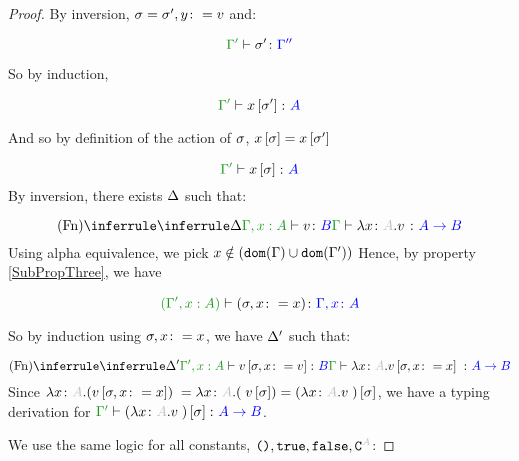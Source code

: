 \documentclass{report}
\begin{document}
\begin{framed}
\begin{proof}
            
                By inversion, $\sigma = \sigma', y\colon= v$
                and:
        
                \begin{equation}
                    \typerelation{\G'}{\si'}{\G''}
                \end{equation}
        
                So by induction,
        
                \begin{equation}
                    \typerelation{\G'}{x\sub{\si'}}{A}
                \end{equation}
        
                And so by definition of the action of $\sigma$, $x\left[\sigma\right] = x\left[\sigma'\right]$
        
                \begin{equation}
                    \typerelation{\G'}{x\sub{\si}}{A}
                \end{equation}
            By inversion, there exists $\Delta$ such that:
        
            \begin{equation}
                \ntreeruleI{Fn}{
                    \treeruleI{\D}{\typerelation{\G, x:A }{v}{B}}
                }{\typerelation{\G}{\lam{x}{A}{v}}{\ab}}
            \end{equation}
            Using alpha equivalence, we pick $x\notin(\texttt{dom}(\Gamma)\cup\texttt{dom}(\Gamma'))$
            Hence, by property \ref{SubPropThree}, we have
        
            \begin{equation}
                \typerelation{(\G', x:A )}{(\si, x\setto x)}{\gax}
            \end{equation}
        
            So by induction using $\sigma, x\colon= x$, we have $\Delta'$ such that:
        
            \begin{equation}
                \ntreeruleI{Fn}{
                    \treeruleI{\D'}{\typerelation{\G', x:A }{v\sub{\si, x\setto v}}{B}}
                }{\typerelation{\G}{\lam{x}{A}{v\sub{\si, x\setto{x}}}}{\ab}}
            \end{equation} 
            Since $\lam{x}{A}{(v\sub{\si, x\setto{x}})} = {\lam{x}{A}({v\ssi})} = (\lam{x}{A}{v})\ssi$, we have a typing derivation for $\typerelation{\G'}{(\lam{x}{A}{v})\ssi}{\ab}$.
        
            We use the same logic for all constants, $\u,\t,\f,\const{A}$:
        

\end{proof}
\end{framed}
\end{document}
